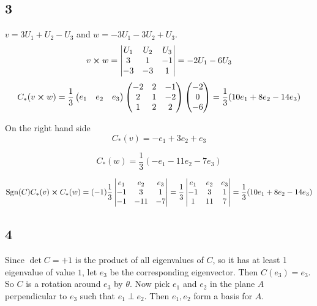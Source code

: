 \documentclass[12pt]{article}
\begin{document}
\subsection*{3}
$v = 3U_1 + U_2 - U_3$ and $w = -3U_1 -3U_2 + U_3$. $$
 v \cross w = \begin{vmatrix}
 	U_1 & U_2 & U_3 \\
 	3 & 1 & -1 \\
 	-3 & -3 & 1
 \end{vmatrix}
 = -2U_1 -6 U_3 $$
$$ 
 C_*(v \cross w) = \frac{1}{3} 
 \begin{pmatrix}
 	e_1 & e_2 & e_3
 \end{pmatrix} \begin{pmatrix}
 	-2 & 2 & -1 \\ 2 & 1 & -2 \\ 1 & 2 & 2
 \end{pmatrix} 
\begin{pmatrix}
 -2 \\ 0 \\ -6 
\end{pmatrix} = \frac{1}{3} (10 e_1 + 8e_2 - 14e_3)
$$

On the right hand side
$$
 C_*(v) = -e_1 + 3e_2 + e_3
$$

$$
C_*(w) = \frac{1}{3} (-e_1 - 11e_2 - 7e_3)
$$

$$
\mbox{Sgn}(C) C_*(v) \cross C_*(w) = (-1) \frac{1}{3} \begin{vmatrix}
	e_1 & e_2 & e_3 \\
	-1 & 3 & 1 \\
	-1 & -11 & -7 \\
\end{vmatrix}
=  \frac{1}{3}  \begin{vmatrix}
	e_1 & e_2 & e_3 \\
	-1 & 3 & 1 \\
	1 & 11 & 7 \\
\end{vmatrix}
=  \frac{1}{3}  (10e_1 + 8e_2 -14e_3)
$$

\subsection*{4}
Since $\det C= +1$ is the product of all eigenvalues of $C$, so it has at least 1 eigenvalue of value $1$, let $e_3$ be the corresponding eigenvector. Then $C(e_3) = e_3$. So $C$ is a rotation around $e_3$ by $\theta$. Now pick $e_1$ and $e_2$ in the plane $A$ perpendicular to $e_3$ such that $e_1 \perp e_2$. Then $e_1, e_2$ form a basis for $A$.
\end{document}
